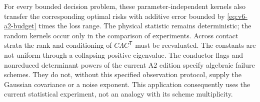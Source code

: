 For every bounded decision problem, these parameter-independent kernels
also transfer the corresponding optimal risks with additive error
bounded by \eqref{eq:v6-a2-budget} times the loss range. The physical
statistic remains deterministic; the random kernels occur only in the
comparison of experiments. Across contact strata the rank and
conditioning of $C\Lambda C^{\mathsf T}$ must be reevaluated. The
constants are not uniform through a collapsing positive eigenvalue.
The conductor flags and nonreduced determinant powers of the current
A2 edition specify algebraic failure schemes. They do not, without
this specified observation protocol, supply the Gaussian covariance
or a noise exponent. This application consequently uses the current
statistical experiment, not an analogy with its scheme multiplicity.
